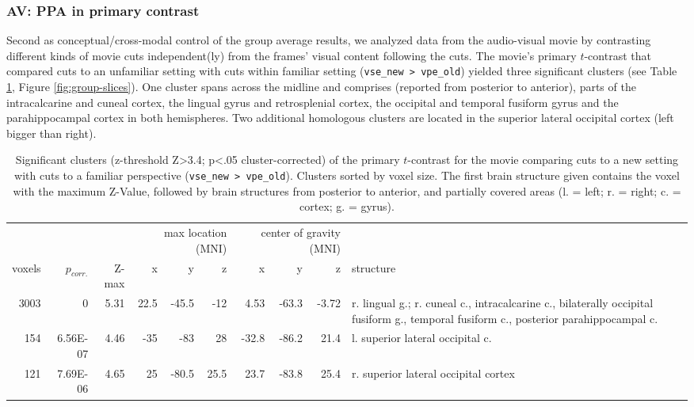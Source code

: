 \documentclass[english]{article}
\begin{document}
\subsubsection{AV: PPA in primary contrast}
Second as conceptual/cross-modal control of the group average results, we
analyzed data from the audio-visual movie by contrasting different kinds of
movie cuts independent(ly) from the frames' visual content following the cuts.
The movie's primary $t$-contrast that compared cuts to an unfamiliar setting
with cuts within familiar setting (\texttt{vse\_new > vpe\_old}) yielded three
significant clusters (see Table \ref{tab:res-av-group1}, Figure
\ref{fig:group-slices}).
One cluster spans across the midline and comprises (reported from posterior to
anterior), parts of the intracalcarine and cuneal cortex, the lingual gyrus and
retrosplenial cortex, the occipital and temporal fusiform gyrus and the
parahippocampal cortex in both hemispheres.
Two additional homologous clusters are located in the superior lateral occipital
cortex (left bigger than right).


\begin{table}[t]
    \caption{Significant clusters (z-threshold Z>3.4; p<.05 cluster-corrected)
        of the primary $t$-contrast for the movie comparing cuts to a new
        setting with cuts to a familiar perspective (\texttt{vse\_new >
        vpe\_old}).
Clusters sorted by voxel size.
The first brain structure given contains the voxel with the maximum Z-Value,
followed by brain structures from posterior to anterior, and partially covered
areas (l. = left; r. = right; c. = cortex; g. = gyrus).}
\label{tab:res-av-group1}
\begin{tabular}{rrrrrrrrrp{3cm}}
\toprule
& & & \multicolumn{3}{r}{max location (MNI)} & \multicolumn{3}{r}{center of gravity (MNI)} &
\\ \cmidrule{4-6} \cmidrule{7-9}
voxels & $p_{corr.}$ & Z-max & x & y & z  & x & y & z & structure \\
\midrule
3003 & 0 & 5.31 & 22.5 & -45.5 & -12 & 4.53 & -63.3 & -3.72 & r. lingual g.; r. cuneal c., intracalcarine c., bilaterally occipital fusiform g., temporal fusiform c., posterior parahippocampal c.  \\
154 & 6.56E-07 & 4.46 & -35 & -83 & 28 & -32.8 & -86.2 & 21.4 & l. superior lateral occipital c. \\
121 & 7.69E-06 & 4.65 & 25 & -80.5 & 25.5 & 23.7 & -83.8 & 25.4 & r. superior lateral occipital cortex \\
\bottomrule
\end{tabular}
\end{table}
\end{document}
